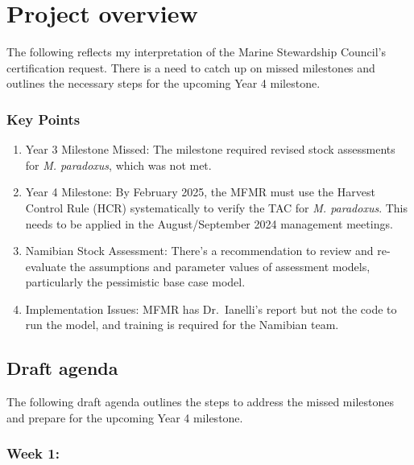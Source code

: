 \documentclass[
  letterpaper,
  DIV=11,
  numbers=noendperiod]{scrartcl}
\providecommand{\tightlist}{%
  \setlength{\itemsep}{0pt}\setlength{\parskip}{0pt}}\usepackage{longtable,booktabs,array}
\begin{document}
\section{Project overview}\label{project-overview}

The following reflects my interpretation of the Marine Stewardship
Council's certification request. There is a need to catch up on missed
milestones and outlines the necessary steps for the upcoming Year 4
milestone.

\subsubsection{Key Points}\label{key-points}

\begin{enumerate}
\def\labelenumi{\arabic{enumi}.}
\tightlist
\item
  Year 3 Milestone Missed: The milestone required revised stock
  assessments for \emph{M. paradoxus}, which was not met.
\item
  Year 4 Milestone: By February 2025, the MFMR must use the Harvest
  Control Rule (HCR) systematically to verify the TAC for \emph{M.
  paradoxus}. This needs to be applied in the August/September 2024
  management meetings.
\item
  Namibian Stock Assessment: There's a recommendation to review and
  re-evaluate the assumptions and parameter values of assessment models,
  particularly the pessimistic base case model.
\item
  Implementation Issues: MFMR has Dr.~Ianelli's report but not the code
  to run the model, and training is required for the Namibian team.
\end{enumerate}

\subsection{Draft agenda}\label{draft-agenda}

The following draft agenda outlines the steps to address the missed
milestones and prepare for the upcoming Year 4 milestone.

\subsubsection{Week 1:}\label{week-1}
\end{document}
